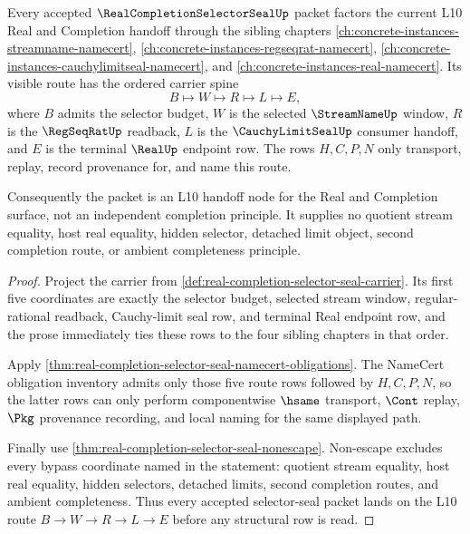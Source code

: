 \begin{theorem}
\label{thm:real-completion-selector-seal-l10-handoff-scope}
Every accepted $\RealCompletionSelectorSealUp$ packet factors the current L10 Real and Completion handoff through the sibling chapters
\autoref{ch:concrete-instances-streamname-namecert},
\autoref{ch:concrete-instances-regseqrat-namecert},
\autoref{ch:concrete-instances-cauchylimitseal-namecert}, and
\autoref{ch:concrete-instances-real-namecert}. Its visible route has the ordered carrier spine
$$
B \longmapsto W \longmapsto R \longmapsto L \longmapsto E,
$$
where $B$ admits the selector budget, $W$ is the selected $\StreamNameUp$ window, $R$ is the $\RegSeqRatUp$ readback, $L$ is the $\CauchyLimitSealUp$ consumer handoff, and $E$ is the terminal $\RealUp$ endpoint row. The rows $H,C,P,N$ only transport, replay, record provenance for, and name this route.

Consequently the packet is an L10 handoff node for the Real and Completion surface, not an independent completion principle. It supplies no quotient stream equality, host real equality, hidden selector, detached limit object, second completion route, or ambient completeness principle.
\end{theorem}
\begin{proof}
Project the carrier from \autoref{def:real-completion-selector-seal-carrier}. Its first five coordinates are exactly the selector budget, selected stream window, regular-rational readback, Cauchy-limit seal row, and terminal Real endpoint row, and the prose immediately ties these rows to the four sibling chapters in that order.

Apply \autoref{thm:real-completion-selector-seal-namecert-obligations}. The NameCert obligation inventory admits only those five route rows followed by $H,C,P,N$, so the latter rows can only perform componentwise $\hsame$ transport, $\Cont$ replay, $\Pkg$ provenance recording, and local naming for the same displayed path.

Finally use \autoref{thm:real-completion-selector-seal-nonescape}. Non-escape excludes every bypass coordinate named in the statement: quotient stream equality, host real equality, hidden selectors, detached limits, second completion routes, and ambient completeness. Thus every accepted selector-seal packet lands on the L10 route $B\to W\to R\to L\to E$ before any structural row is read.
\end{proof}

